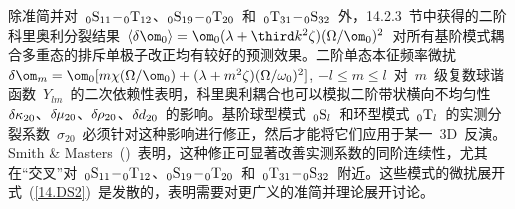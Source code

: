 除准简并对~${}_0{\rm S}_{11}\!-\!{}_0{\rm T}_{12}$、${}_0{\rm S}_{19}\!-\!{}_0{\rm T}_{20}$~和~${}_0{\rm T}_{31}\!-\!{}_0{\rm S}_{32}$~外，14.2.3~节中获得的二阶科里奥利分裂结果~$\langle\delta\om_0\rangle
=\om_0(\lambda+\third k^2\zeta)(\Omega/\om_0)^2$~对所有基阶模式耦合多重态的排斥单极子改正均有较好的预测效果。二阶单态本征频率微扰~$\delta\om_m=\om_0[m\chi(\Omega/\om_0)+(\lambda+m^2\zeta)
(\Omega/\omega_0)^2]$, $-l\leq m\leq l$~对~$m$~级复数球谐函数~$Y_{lm}$~的二次依赖性表明，科里奥利耦合也可以模拟二阶带状横向不均匀性~$\delta\hspace{-0.1 mm}\kappa_{20}$、$\delta\hspace{-0.2 mm}\mu_{20}$、$\delta\hspace{-0.2 mm}\rho_{20}$、$\delta\hspace{-0.1 mm}d_{20}$~的影响。基阶球型模式~${}_0{\rm S}_l$~和环型模式~${}_0{\rm T}_l$~的实测分裂系数~$\sigma_{20}$~必须针对这种影响进行修正，然后才能将它们应用于某一~3D~反演。Smith \& Masters~(\citeyear{smith&masters89b})~表明，这种修正可显著改善实测系数的同阶连续性，尤其在“交叉”对~${}_0{\rm S}_{11}\!-\!{}_0{\rm T}_{12}$、${}_0{\rm S}_{19}\!-\!{}_0{\rm T}_{20}$~和~${}_0{\rm T}_{31}\!-\!{}_0{\rm S}_{32}$~附近。这些模式的微扰展开式~(\ref{14.DS2})~是发散的，表明需要对更广义的准简并理论展开讨论。
